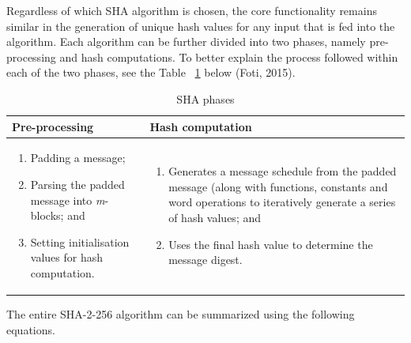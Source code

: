     Regardless of which SHA algorithm is chosen, the core functionality remains similar in the generation of unique hash values for any input that is fed into the algorithm. Each algorithm can be further divided into two phases, namely pre-processing and hash computations. To better explain the process followed within each of the two phases, see the Table ~\ref{table: SHA phases} below (Foti, 2015).
    
    
    \begin{table}[h]
        \caption{SHA phases}
        \begin{tabular}{|p{} | p{}|}
          \hline
         \textbf{Pre-processing} & \textbf{Hash computation} \\
         \hline\hline
            \begin{enumerate}
                \item Padding a message;
                \item Parsing the padded message into \textit{m}-blocks; and
                \item Setting initialisation values for hash computation.
            \end{enumerate}
             & 
             \begin{enumerate}
                 \item Generates a message schedule from the padded message (along with functions, constants and word operations to iteratively generate a series of hash values; and
                 \item Uses the final hash value to determine the message digest.
             \end{enumerate} \\
             \hline
        \end{tabular}
        \label{table: SHA phases}
    \end{table}
    
    The entire SHA-2-256 algorithm can be summarized using the following equations.
    
    
